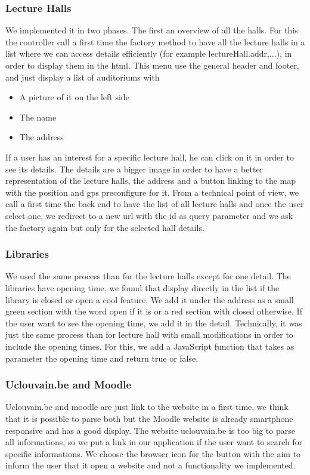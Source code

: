 \documentclass{eplmastersthesis}
\begin{document}
\subsubsection{Lecture Halls}
We implemented it in two phases. The first an overview of all the halls. For this the controller call a first time the factory method to have all the lecture halls in a list where we can access details efficiently (for example lectureHall.addr,...), in order to display them in the html. This menu use the general header and footer, and just display a list of auditoriums with
\begin{itemize}
\item A picture of it on the left side
\item The name
\item The address
\end{itemize}
If a user has an interest for a specific lecture hall, he can click on it in order to see its details. The details are a bigger image in order to have a better representation of the lecture halls, the address and a button linking to the map with the position and gps preconfigure for it.
From a technical point of view, we call a first time the back end to have the list of all lecture halls and once the user select one, we redirect to a new url with the id as query parameter and we ask the factory again but only for the selected hall details.

\subsubsection{Libraries}
We used the same process than for the lecture halls except for one detail. The libraries have opening time, we found that display directly in the list if the library is closed or open a cool feature. We add it under the address as a small green section with the word open if it is or a red section with closed otherwise. If the user want to see the opening time, we add it in the detail. 
Technically, it was just the same process than for lecture hall with small modifications in order to include the opening times. For this, we add a JavaScript function that takes as parameter the opening time and return true or false.

\subsubsection{Uclouvain.be and Moodle}

Uclouvain.be and moodle are just link to the website in a first time, we think that it is possible to parse both but the Moodle website is already smartphone responsive and has a good display. The website uclouvain.be is too big to parse all informations, so we put a link in our application if the user want to search for specific informations. We choose the browser icon for the button with the aim to inform the user that it open a website and not a functionality we implemented. 
\end{document}
